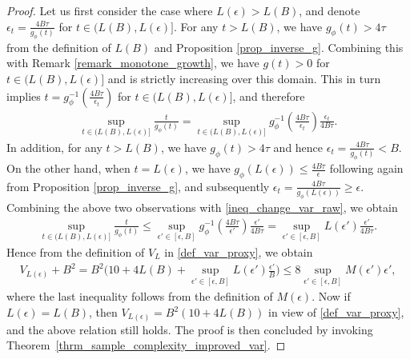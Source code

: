 \documentclass[9pt]{article} %
\numberwithin{equation}{section}
\renewcommand{\frac}[2]{\tfrac{#1}{#2}}
\begin{document}
\begin{proof}
Let us first consider the case where $L(\epsilon) > L(B)$, and denote $\epsilon_t = \frac{4 B\tau}{g_\phi(t)}$ for $t \in (L(B), L(\epsilon)]$. 
For any $t > L(B)$, we have $g_\phi(t) > 4\tau$ from the definition of $L(B) $ and Proposition \ref{prop_inverse_g}.      
Combining this with Remark \ref{remark_monotone_growth}, we have $g(t) > 0$ for $t \in (L(B), L(\epsilon)]$ and is strictly increasing over this domain.
This in turn implies 
$t = g_\phi^{-1}(\frac{4 B\tau}{\epsilon_t})$ for $t \in (L(B), L(\epsilon)]$, and therefore 
\begin{align}\label{ineq_change_var_raw}
 \sup_{t \in (L(B), L(\epsilon)] } \frac{t}{g_\phi (t)}
 =  \sup_{t \in (L(B), L(\epsilon)] }  g_\phi^{-1} (\frac{4 B\tau}{\epsilon_t}) \frac{\epsilon_t}{4B\tau}.
\end{align}
In addition,  for any $t > L(B)$, 
we have $g_\phi(t) > 4 \tau$  and hence  $\epsilon_t = \frac{4B\tau}{g_\phi(t)} < B$.
On the other hand, when $t = L(\epsilon)$, we have $g_\phi(L(\epsilon)) \leq \frac{4B\tau}{\epsilon}$ following again from Proposition \ref{prop_inverse_g}, and subsequently 
$\epsilon_t = \frac{4B\tau}{g_\phi (L(\epsilon))} \geq \epsilon$. 
Combining the above two observations with \eqref{ineq_change_var_raw}, we obtain 
\begin{align*}
 \sup_{t \in (L(B), L(\epsilon)] } \frac{t}{g_\phi (t)}
\leq \sup_{\epsilon' \in [\epsilon, B]}  g_\phi^{-1} (\frac{4 B\tau}{\epsilon'}) \frac{\epsilon'}{4B\tau}
= \sup_{\epsilon' \in [\epsilon, B]}  L(\epsilon') \frac{\epsilon'}{4B\tau}.
\end{align*}
Hence from the definition of $V_L$ in \eqref{def_var_proxy}, we obtain 
\begin{align*}
V_{L(\epsilon)} + B^2  = B^2 \bigg(10 + 4 L(B) +   \sup_{\epsilon' \in [\epsilon, B]}  L(\epsilon') \frac{\epsilon'}{B} \bigg)
\leq 8   \sup_{\epsilon' \in [\epsilon, B]}  M(\epsilon') \epsilon',
\end{align*}
where the last inequality follows from the definition of $M(\epsilon)$. 
Now if $L(\epsilon) = L(B)$, then $V_{L(\epsilon)} = B^2 (10 + 4 L(B))$  in view of \eqref{def_var_proxy}, and the above relation still holds.
The proof is then concluded by invoking Theorem~\ref{thrm_sample_complexity_improved_var}.
\end{proof}
\end{document}
